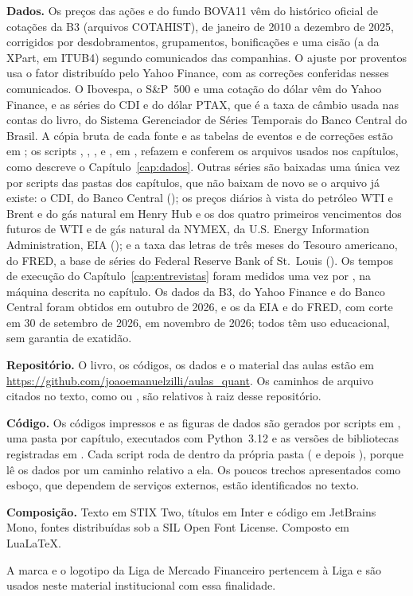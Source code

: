\textbf{Dados.} Os preços das ações e do fundo BOVA11 vêm do histórico oficial de cotações da B3 (arquivos COTAHIST), de janeiro de 2010 a dezembro de 2025, corrigidos por desdobramentos, grupamentos, bonificações e uma cisão (a da XPart, em ITUB4) segundo comunicados das companhias. O ajuste por proventos usa o fator distribuído pelo Yahoo Finance, com as correções conferidas nesses comunicados. O Ibovespa, o S\&P~500 e uma cotação do dólar vêm do Yahoo Finance, e as séries do CDI e do dólar PTAX, que é a taxa de câmbio usada nas contas do livro, do Sistema Gerenciador de Séries Temporais do Banco Central do Brasil. A cópia bruta de cada fonte e as tabelas de eventos e de correções estão em ; os scripts , , ,  e , em , refazem e conferem os arquivos usados nos capítulos, como descreve o Capítulo~\ref{cap:dados}. Outras séries são baixadas uma única vez por scripts  das pastas dos capítulos, que não baixam de novo se o arquivo já existe: o CDI, do Banco Central (); os preços diários à vista do petróleo WTI e Brent e do gás natural em Henry Hub e os dos quatro primeiros vencimentos dos futuros de WTI e de gás natural da NYMEX, da U.S. Energy Information Administration, EIA (); e a taxa das letras de três meses do Tesouro americano, do FRED, a base de séries do Federal Reserve Bank of St.~Louis (). Os tempos de execução do Capítulo~\ref{cap:entrevistas} foram medidos uma vez por , na máquina descrita no capítulo. Os dados da B3, do Yahoo Finance e do Banco Central foram obtidos em outubro de 2026, e os da EIA e do FRED, com corte em 30 de setembro de 2026, em novembro de 2026; todos têm uso educacional, sem garantia de exatidão.

\textbf{Repositório.} O livro, os códigos, os dados e o material das aulas estão em \url{https://github.com/joaoemanuelzilli/aulas_quant}. Os caminhos de arquivo citados no texto, como  ou , são relativos à raiz desse repositório.

\textbf{Código.} Os códigos impressos e as figuras de dados são gerados por scripts em , uma pasta por capítulo, executados com Python~3.12 e as versões de bibliotecas registradas em . Cada script roda de dentro da própria pasta ( e depois ), porque lê os dados por um caminho relativo a ela. Os poucos trechos apresentados como esboço, que dependem de serviços externos, estão identificados no texto.

\textbf{Composição.} Texto em STIX Two, títulos em Inter e código em JetBrains Mono, fontes distribuídas sob a SIL Open Font License. Composto em Lua\LaTeX.

A marca e o logotipo da Liga de Mercado Financeiro pertencem à Liga e são usados neste material institucional com essa finalidade.
\endgroup
\clearpage
